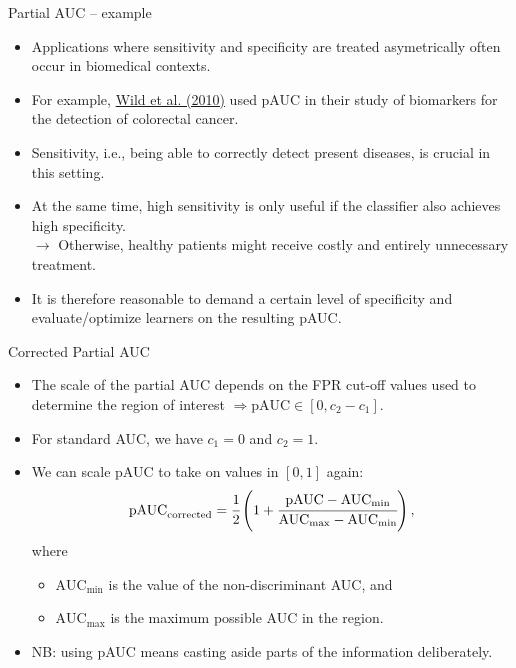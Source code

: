 \documentclass[11pt,compress,t,notes=noshow, xcolor=table]{beamer}
\begin{document}
\begin{vbframe}{Partial AUC -- example}

\begin{itemize}
  \item Applications where sensitivity and specificity are treated asymetrically 
  often occur in biomedical contexts.
  \item For example, 
  \href{https://clincancerres.aacrjournals.org/content/16/24/6111}
  {Wild et al. (2010)} used pAUC in their study of biomarkers for the detection 
  of colorectal cancer.
  \item Sensitivity, i.e., being able to correctly detect present diseases, is 
  crucial in this setting.
  \item At the same time, high sensitivity is only useful if the classifier also 
  achieves high specificity. \\
  $\rightarrow$ Otherwise, healthy patients might receive costly and entirely 
  unnecessary treatment.
  \item It is therefore reasonable to demand a certain level of specificity and 
  evaluate/optimize learners on the resulting pAUC.
\end{itemize}

\end{vbframe}


\begin{vbframe}{Corrected Partial AUC}

\begin{itemize}
  \item The scale of the partial AUC depends on the FPR cut-off values used to 
  determine the region of interest $\Rightarrow \text{pAUC} \in [0, c_2 - c_1]$.
  \item For standard AUC, we have $c_1 = 0$ and $c_2 = 1$.
  \item We can scale pAUC to take on values in $[0, 1]$ again:
  $$\text{pAUC}_\text{corrected} = \cfrac{1}{2} \left( 1 + \cfrac{\text{pAUC} - 
  \text{AUC}_{\text{min}}}{\text{AUC}_{\text{max}} - \text{AUC}_{\text{min}}} 
  \right),$$
  where
  \begin{itemize}
    \item $\text{AUC}_{\text{min}}$ is the value of the non-discriminant AUC, 
    and
    \item $\text{AUC}_{\text{max}}$ is the maximum possible AUC in the region.
  \end{itemize}
  \lz
  \item NB: using pAUC means casting aside parts of the information 
  deliberately.
\end{itemize}

\end{vbframe}


\endlecture
\end{document}
